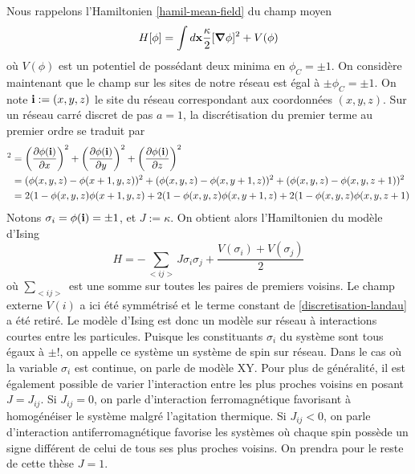 Nous rappelons l'Hamiltonien \ref{hamil-mean-field} du champ moyen 
\begin{align}
    H[\phi] = \int d {\bf x}  \frac{\kappa}{2}[{\boldsymbol \nabla} \phi]^2 + V(\phi)
\end{align}
où $V(\phi)$ est un potentiel de possédant deux minima en $\phi_C = \pm1$. On considère maintenant que le champ sur les sites de notre réseau est égal à $\pm \phi_C = \pm 1$. On note ${\bf i}:=(x,y,z)$ le site du réseau correspondant aux coordonnées $(x,y,z)$. Sur un réseau carré discret de pas $a=1$, la discrétisation du premier terme au premier ordre se traduit par 
\begin{align}
    [{\boldsymbol \nabla} \phi({\bf i})]^2 &= \left( \frac{\partial \phi({\bf i})}{\partial x} \right)^2  + \left( \frac{\partial \phi({\bf i})}{\partial y} \right)^2 + \left( \frac{\partial \phi({\bf i})}{\partial z} \right)^2\nn
    &= (\phi(x,y,z)-\phi(x+1,y,z))^2 + (\phi(x,y,z)-\phi(x,y+1,z))^2 + (\phi(x,y,z)-\phi(x,y,z+1))^2 \nn
    &= 2 (1-\phi(x,y,z)\phi(x+1,y,z) + 2 (1-\phi(x,y,z)\phi(x,y+1,z) +2 (1-\phi(x,y,z)\phi(x,y,z+1) 
    \label{discretisation-landau}
\end{align}
Notons $\sigma_i = \phi({\bf i}) = \pm 1$, et $J := \kappa$. On obtient alors l'Hamiltonien du modèle d'Ising
\begin{equation}
	H =  - \sum_{<i j >} J \sigma_i \sigma_j + \frac{V(\sigma_i)+V(\sigma_j)}{2}
	\label{hamil-ising}
\end{equation}
où $\sum_{< ij >}$ est une somme sur toutes les paires de premiers voisins. Le champ externe $V(i)$ a ici été symmétrisé et le terme constant de \ref{discretisation-landau} a été retiré.
Le modèle d'Ising\cite{niss_history_2005,niss_history_2009} est donc un modèle sur réseau à interactions courtes entre les particules. Puisque les constituants $\sigma_i$ du système sont tous égaux à $\pm!$, on appelle ce système un système de spin sur réseau. Dans le cas où la variable $\sigma_i$ est continue, on parle de modèle XY. Pour plus de généralité, il est également possible de varier l'interaction entre les plus proches voisins en posant $J = J_{ij}$. Si $ J_{ij} =0$, on parle d'interaction ferromagnétique favorisant à homogénéiser le système malgré l'agitation thermique. Si  $J_{ij} < 0$, on parle d'interaction antiferromagnétique favorise les systèmes où chaque spin possède un signe différent de celui de tous ses plus proches voisins. On prendra pour le reste de cette thèse $J=1$.

